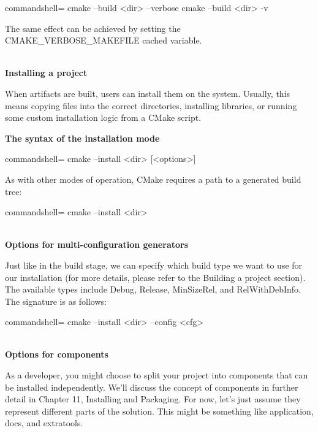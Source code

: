 \begin{tcblisting}{commandshell={}}
cmake --build <dir> --verbose
cmake --build <dir> -v
\end{tcblisting}

The same effect can be achieved by setting the CMAKE\_VERBOSE\_MAKEFILE cached variable.

\hspace*{\fill} \\ %
\noindent
\textbf{Installing a project}

When artifacts are built, users can install them on the system. Usually, this means copying files into the correct directories, installing libraries, or running some custom installation logic from a CMake script.

\textbf{The syntax of the installation mode}

\begin{tcblisting}{commandshell={}}
cmake --install <dir> [<options>]
\end{tcblisting}

As with other modes of operation, CMake requires a path to a generated build tree:

\begin{tcblisting}{commandshell={}}
cmake --install <dir>
\end{tcblisting}

\hspace*{\fill} \\ %
\noindent
\textbf{Options for multi-configuration generators}

Just like in the build stage, we can specify which build type we want to use for our installation (for more details, please refer to the Building a project section). The available types include Debug, Release, MinSizeRel, and RelWithDebInfo. The signature is as follows:

\begin{tcblisting}{commandshell={}}
cmake --install <dir> --config <cfg>
\end{tcblisting}

\hspace*{\fill} \\ %
\noindent
\textbf{Options for components}

As a developer, you might choose to split your project into components that can be installed independently. We'll discuss the concept of components in further detail in Chapter 11, Installing and Packaging. For now, let's just assume they represent different parts of the solution. This might be something like application, docs, and extratools.


